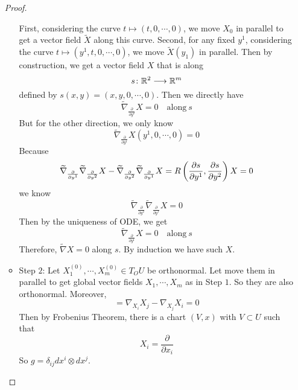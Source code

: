 \begin{enumerate}[label=\arabic{*}.]
\begin{proof}
\begin{itemize}
			\noindent First, considering the curve $t \mapsto (t,0,\cdots,0)$, we move $X_0$ in parallel to get a vector field $\tilde{X}$ along this curve. Second, for any fixed $y^1$, considering the curve $t \mapsto (y^1,t,0,\cdots,0)$, we move $\tilde{X}(y_1)$ in parallel. Then by construction, we get a vector field $X$ that is along
			\begin{equation*}
				s \colon \mathbb{R}^2 \longrightarrow \mathbb{R}^m
			\end{equation*}
			defined by $s(x,y) = (x,y,0,\cdots,0)$. Then we directly have
			\begin{equation*}
				\widetilde{\nabla}_{\frac{\partial}{\partial y^2}}X = 0 \quad \text{along}~s
			\end{equation*}
			But for the other direction, we only know
			\begin{equation*}
				\widetilde{\nabla}_{\frac{\partial}{\partial y^1}}X(y^1,0,\cdots,0) = 0 
			\end{equation*}
			Because
			\begin{equation*}
				\widetilde{\nabla}_{\frac{\partial}{\partial y^1}}\widetilde{\nabla}_{\frac{\partial}{\partial y^2}}X-\widetilde{\nabla}_{\frac{\partial}{\partial y^2}}\widetilde{\nabla}_{\frac{\partial}{\partial y^1}}X = R\left(\frac{\partial s}{\partial y^1},\frac{\partial s}{\partial y^2}\right)X = 0
			\end{equation*}
			we know
			\begin{equation*}
				\widetilde{\nabla}_{\frac{\partial}{\partial y^2}}\widetilde{\nabla}_{\frac{\partial}{\partial y^1}}X = 0
			\end{equation*}
			Then by the uniqueness of ODE, we get
			\begin{equation*}
				\widetilde{\nabla}_{\frac{\partial}{\partial y^1}}X = 0 \quad \text{along}~s
			\end{equation*}
			Therefore, $\widetilde{\nabla}X = 0$ along $s$. By induction we have such $X$.

			\item Step $2$: Let $X_1^{(0)},\cdots,X_m^{(0)} \in T_OU$ be orthonormal. Let move them in parallel to get global vector fields $X_1,\cdots, X_m$ as in Step $1$. So they are also orthonormal. Moreover,
			\begin{equation*}
				[X_i,X_j] = \nabla_{X_i}X_j - \nabla_{X_j}X_i = 0
			\end{equation*}
			Then by Frobenius Theorem, there is a chart $(V,x)$ with $V \subset U$ such that
			\begin{equation*}
				X_i = \frac{\partial}{\partial x_i}
			\end{equation*}
			So $g = \delta_{ij}dx^i \otimes dx^j$.\qedhere
		\end{itemize}
	\end{proof}
\end{enumerate}


